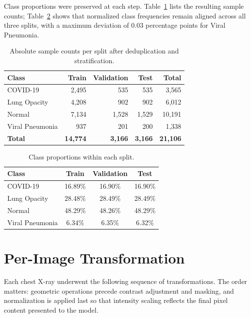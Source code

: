 Class proportions were preserved at each step. Table~\ref{tab:split_counts} lists
the resulting sample counts; Table~\ref{tab:split_proportions} shows that
normalized class frequencies remain aligned across all three splits, with a maximum
deviation of 0.03 percentage points for Viral Pneumonia.

\begin{table}[H]
\centering
\caption{Absolute sample counts per split after deduplication and stratification.}
\label{tab:split_counts}
\begin{tabular}{lrrrr}
\toprule
\textbf{Class} & \textbf{Train} & \textbf{Validation} & \textbf{Test} & \textbf{Total} \\
\midrule
COVID-19        & 2{,}495 & 535 & 535 & 3{,}565 \\
Lung Opacity    & 4{,}208 & 902 & 902 & 6{,}012 \\
Normal          & 7{,}134 & 1{,}528 & 1{,}529 & 10{,}191 \\
Viral Pneumonia & 937 & 201 & 200 & 1{,}338 \\
\midrule
\textbf{Total}  & \textbf{14{,}774} & \textbf{3{,}166} & \textbf{3{,}166} & \textbf{21{,}106} \\
\bottomrule
\end{tabular}
\end{table}

\begin{table}[H]
\centering
\caption{Class proportions within each split.}
\label{tab:split_proportions}
\begin{tabular}{lccc}
\toprule
\textbf{Class} & \textbf{Train} & \textbf{Validation} & \textbf{Test} \\
\midrule
COVID-19        & 16.89\% & 16.90\% & 16.90\% \\
Lung Opacity    & 28.48\% & 28.49\% & 28.49\% \\
Normal          & 48.29\% & 48.26\% & 48.29\% \\
Viral Pneumonia & 6.34\%  & 6.35\%  & 6.32\% \\
\bottomrule
\end{tabular}
\end{table}

\section{Per-Image Transformation}

Each chest X-ray underwent the following sequence of transformations.
The order matters: geometric operations precede contrast adjustment and masking,
and normalization is applied last so that intensity scaling reflects the final
pixel content presented to the model.


